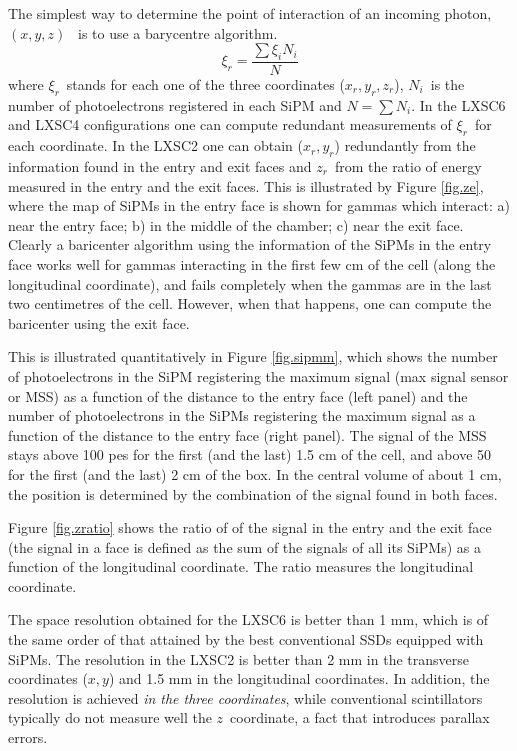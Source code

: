 \documentclass{JINST}
\begin{document}
The simplest way to determine the point of interaction of an incoming photon, $(x,y,z)$~ is to use a barycentre algorithm. 
\[
\xi_r = \frac{\sum \xi_i N_i}{N}
\]
where $\xi_r$~stands for each one of the three coordinates ($x_r, y_r, z_r$), $N_i$~is the number of photoelectrons registered in each SiPM and $N=\sum N_i$. In the LXSC6 and LXSC4 configurations one can compute redundant measurements of $\xi_r$~for each coordinate. In the LXSC2 one can obtain ($x_r,y_r$) redundantly from the information found in the entry and exit faces and $z_r$~from the ratio of energy measured in the entry and the exit faces. This is illustrated by Figure \ref{fig.ze}, where the map of SiPMs in the entry face  is shown for gammas which interact: a) near the entry face; b) in the middle of the chamber; c) near the exit face. Clearly a baricenter algorithm using the information of the SiPMs in the entry face works well for gammas interacting in the first few cm of the cell (along the longitudinal coordinate), and fails completely when the gammas are in the last two centimetres of the cell. However, when that happens, one can compute the baricenter using the exit face. 

This is illustrated quantitatively in Figure \ref{fig.sipmm}, which shows the number of photoelectrons in the SiPM registering the maximum signal (max signal sensor or MSS) as a function of the distance to the entry face (left panel) and the number of photoelectrons in the SiPMs registering the maximum signal as a function of the distance to the entry face (right panel). The signal of the MSS stays above 100 pes for the first (and the last) 1.5 cm of the cell, and above 50 for the first (and the last) 2 cm of the box. In the central volume of about 1 cm, the position is determined by the combination of the signal found in both faces. 

Figure \ref{fig.zratio} shows the ratio of of the signal in the entry and the exit face (the signal in a face is defined as the sum of the signals of all its SiPMs) as a function of the longitudinal coordinate. The ratio measures the longitudinal coordinate.  

The space resolution obtained for the LXSC6 is better than 1 mm, which is of the same order of that attained by the best conventional SSDs equipped with SiPMs. The resolution in the LXSC2 is better than 2 mm in the transverse coordinates ($x,y$) and 1.5 mm in the longitudinal coordinates.  In addition, the resolution is achieved {\em in the three coordinates}, while conventional scintillators typically do not measure well the $z$~coordinate, a fact that introduces parallax errors. 
\end{document}

